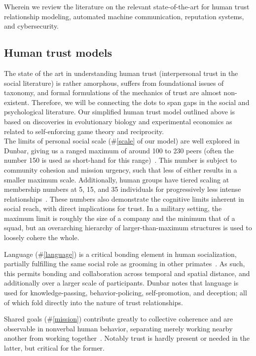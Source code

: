 Wherein we review the literature on the relevant state-of-the-art for human trust relationship modeling, automated machine communication, reputation systems, and cybersecurity.

\subsection{Human trust models}\label{subsec:trust}

The state of the art in understanding human trust (interpersonal trust in the social literature) is rather amorphous, suffers from foundational issues of taxonomy, and formal formulations of the mechanics of trust are almost non-existent.
Therefore, we will be connecting the dots to span gaps in the social and psychological literature.
Our simplified human trust model outlined above is based on discoveries in evolutionary biology and experimental economics as related to self-enforcing game theory and reciprocity.
\\[10pt]
The limits of personal social scale (\#\ref{scale} of our model) are well explored in Dunbar, giving us a ranged maximum of around 100 to 230 peers (often the number 150 is used as short-hand for this range)~\cite{dunbar1992neocortex}.
This number is subject to community cohesion and mission urgency, such that less of either results in a smaller maximum scale.
Additionally, human groups have tiered scaling at membership numbers at 5, 15, and 35 individuals for progressively less intense relationships~\cite{hill2003social}.
These numbers also demonstrate the cognitive limits inherent in social reach, with direct implications for trust.
In a military setting, the maximum limit is roughly the size of a company and the minimum that of a squad, but an overarching hierarchy of larger-than-maximum structures is used to loosely cohere the whole.

Language (\#\ref{language}) is a critical bonding element in human socialization, partially fulfilling the same social role as grooming in other primates~\cite{dunbar2004gossip}.
As such, this permits bonding and collaboration across temporal and spatial distance, and additionally over a larger scale of participants.
Dunbar notes that language is used for knowledge-passing, behavior-policing, self-promotion, and deception; all of which fold directly into the nature of trust relationships.

Shared goals (\#\ref{mission}) contribute greatly to collective coherence and are observable in nonverbal human behavior, separating merely working nearby another from working together~\cite{sacheli2015social}.
Notably trust is hardly present or needed in the latter, but critical for the former.

